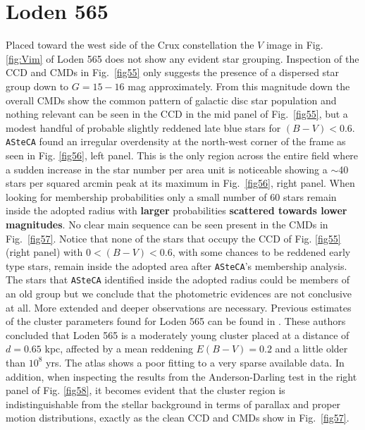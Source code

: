 \documentclass[referee]{aa}
\begin{document}
\section{Loden 565}

Placed toward the west side of the Crux constellation the $V$ image in Fig. 
\ref{fig:Vim} of Loden 565 does not show any evident star grouping. Inspection
of the CCD and CMDs in Fig.~\ref{fig55} only suggests the presence of a
dispersed star group down to $G=15-16$ mag approximately. From this magnitude
down the overall CMDs show the common pattern of galactic disc star population
and nothing relevant can be seen in the CCD in the mid panel of
Fig.~\ref{fig55}, but a modest handful of probable slightly reddened late blue
stars for $(B-V)<0.6$.\\

\texttt{ASteCA} found an irregular overdensity at the north-west corner of the
frame as seen in Fig. \ref{fig56}, left panel. This is the only region across the
entire field where a sudden increase in the star number per area unit is
noticeable showing a $\sim$40 stars per squared arcmin peak at its maximum in
Fig.~\ref{fig56}, right panel.
%
When looking for membership probabilities only a small number of 60 stars
remain inside the adopted radius with \textbf{larger} probabilities
\textbf{scattered towards lower magnitudes}.
No clear main sequence can be seen present in the CMDs in Fig.~\ref{fig57}.
Notice that none of the stars that
occupy the CCD of Fig. \ref{fig55} (right panel) with $0<(B-V)<0.6$, with some
chances to be reddened early type stars, remain inside the adopted area after 
\texttt{ASteCA}'s membership analysis. The stars that \texttt{ASteCA}
identified inside the adopted radius could be members of an old group but we
conclude that the photometric evidences are not conclusive at all.
%
More extended and deeper observations are necessary. Previous estimates of the
cluster parameters found for Loden 565 can be found in \cite{Kharchenko_2005}.
These authors concluded that Loden 565 is a moderately young cluster placed at a
distance of $d=0.65$ kpc, affected by a mean reddening $E(B-V)= 0.2$ and
a little older than $10^8$ yrs. The \cite{Kharchenko_2005} atlas shows a
poor fitting to a very sparse available data. In addition, when inspecting the
results from the Anderson-Darling test in the right panel of Fig. \ref{fig58},
it becomes evident that the cluster region is indistinguishable from the
stellar background in terms of parallax and proper motion distributions,
exactly as the clean CCD and CMDs show in Fig.~\ref{fig57}.\\
\end{document}
